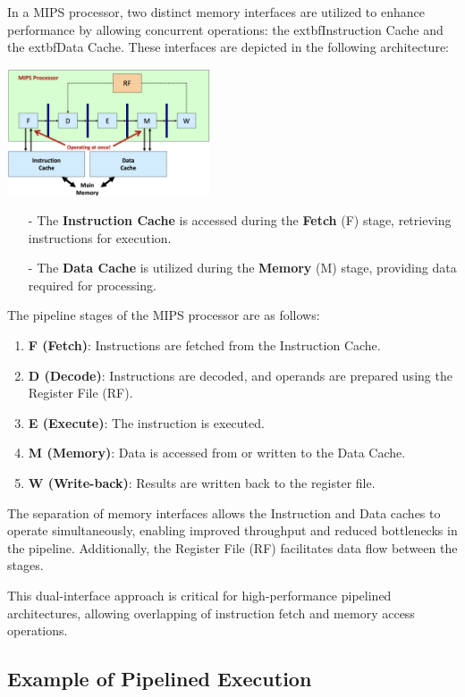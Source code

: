 In a MIPS processor, two distinct memory interfaces are utilized to enhance performance by allowing concurrent operations: the 	extbf{Instruction Cache} and the 	extbf{Data Cache}. These interfaces are depicted in the following architecture:
\begin{center}
    \includegraphics[width=0.45\textwidth]{chapters/chapter4c/images/mips.png}
\end{center}
\begin{itemize}
    \item[-] The \textbf{Instruction Cache} is accessed during the \textbf{Fetch} (F) stage, retrieving instructions for execution.
    \item[-] The \textbf{Data Cache} is utilized during the \textbf{Memory} (M) stage, providing data required for processing.
\end{itemize}

The pipeline stages of the MIPS processor are as follows:
\begin{enumerate}
    \item \textbf{F (Fetch)}: Instructions are fetched from the Instruction Cache.
    \item \textbf{D (Decode)}: Instructions are decoded, and operands are prepared using the Register File (RF).
    \item \textbf{E (Execute)}: The instruction is executed.
    \item \textbf{M (Memory)}: Data is accessed from or written to the Data Cache.
    \item \textbf{W (Write-back)}: Results are written back to the register file.
\end{enumerate}

The separation of memory interfaces allows the Instruction and Data caches to operate simultaneously, enabling improved throughput and reduced bottlenecks in the pipeline. Additionally, the Register File (RF) facilitates data flow between the stages.

This dual-interface approach is critical for high-performance pipelined architectures, allowing overlapping of instruction fetch and memory access operations.

\subsection{Example of Pipelined Execution }
